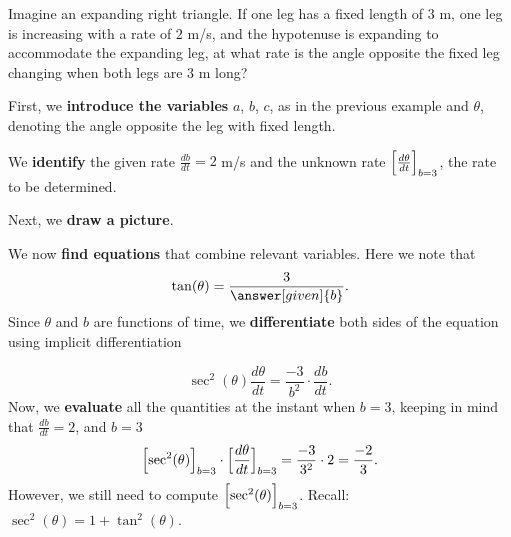 \documentclass{ximera}
\begin{document}
\begin{example}
  Imagine an expanding right triangle. If one leg has a fixed length
  of $3$ m, one leg is increasing with a rate of $2$ m/s, and the
  hypotenuse is expanding to accommodate the expanding leg, at what
  rate is the angle opposite the fixed leg changing when both legs
  are $3$ m long?
  \begin{explanation}
  First, we \textbf{introduce the variables}  $a$, $b$, $c$, as in the previous example and $\theta$, denoting
  the angle opposite the leg with fixed length. 
  
  
  We \textbf{identify} the given rate $\frac{db}{dt}=2$ m/s and the unknown rate $\Bigl[\frac{d\theta}{dt}\Bigr]_{b=3}$, the rate to be determined.
  
  
    Next, we \textbf{draw a picture}.
     \begin{image}
    \end{image}

 
    We now \textbf{find equations} that combine relevant
    variables. Here we note that
    \[
    \tan(\theta) = \frac{3}{\answer[given]{b}}.
    \]
    Since $\theta$ and $b$ are functions of time, we
      \textbf{differentiate}  both sides of  the equation using
    implicit differentiation

    \[
    \sec^2(\theta)\frac{d\theta}{dt} = \frac{-3}{b^2}\cdot \frac{db}{dt}.
    \]
    Now, we \textbf{evaluate} all the quantities at the instant when $b=3$, keeping in mind that
    $\frac{db}{dt} = 2$, and $b = 3$
 \[
    \Bigl[\sec^2(\theta)\Bigr]_{b=3}\cdot \Bigl[\dfrac{d\theta}{dt}\Bigr]_{b=3} = \frac{-3}{3^2}\cdot 2\\
    = \frac{-2}{3} .
 \]
    However, we still need to compute $ \Bigl[\sec^2(\theta)\Bigr]_{b=3}$. Recall: $\sec^2(\theta)=1+\tan^2(\theta)$.
  

\end{explanation}
\end{example}
\end{document}
